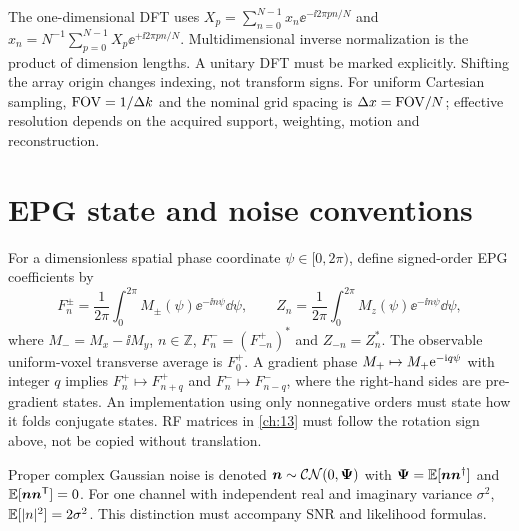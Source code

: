 The one-dimensional DFT uses
$X_p=\sum_{n=0}^{N-1}x_n\ee^{-\ii2\pi pn/N}$ and
$x_n=N^{-1}\sum_{p=0}^{N-1}X_p\ee^{+\ii2\pi pn/N}$.
Multidimensional inverse normalization is the product of dimension
lengths. A unitary DFT must be marked explicitly. Shifting the array
origin changes indexing, not transform signs. For uniform Cartesian
sampling, $\mathrm{FOV}=1/\Delta k$ and the nominal grid spacing is
$\Delta x=\mathrm{FOV}/N$; effective resolution depends on the acquired support,
weighting, motion and reconstruction.

\section*{EPG state and noise conventions}
For a dimensionless spatial phase coordinate $\psi\in[0,2\pi)$,
define signed-order EPG coefficients by
\begin{equation}
 F_n^\pm=\frac{1}{2\pi}\int_0^{2\pi}M_\pm(\psi)
             \ee^{-\ii n\psi}\dd\psi,\qquad
 Z_n=\frac{1}{2\pi}\int_0^{2\pi}M_z(\psi)
             \ee^{-\ii n\psi}\dd\psi ,
 \label{eq:convention:epg}
\end{equation}
where $M_-=M_x-\ii M_y$, $n\in\mathbb Z$,
$F_n^-=(F_{-n}^+)^*$ and $Z_{-n}=Z_n^*$.
The observable uniform-voxel transverse average is $F_0^+$.
A gradient phase $M_{+}\mapsto M_{+}\mathrm{e}^{-\mathrm{i} q\psi}$ with
integer $q$ implies
$F_n^+\mapsto F_{n+q}^+$ and $F_n^-\mapsto F_{n-q}^-$,
where the right-hand sides are pre-gradient states.
An implementation using only nonnegative orders must state how it
folds conjugate states. RF matrices in \cref{ch:13} must follow the
rotation sign above, not be copied without translation.

Proper complex Gaussian noise is denoted
$\bm{n}\sim\mathcal{CN}(0,\mathbf{\Psi})$ with
$\mathbf{\Psi}=\operatorname{\mathbb{E}}[\bm{n}\bm{n}^{\dagger}]$ and
$\operatorname{\mathbb{E}}[\bm{n}\bm{n}^{\mathsf T}]=0$.
For one channel with independent real and imaginary variance $\sigma^2$,
$\operatorname{\mathbb{E}}[\lvert n\rvert^2]=2\sigma^2$. This distinction must accompany SNR and
likelihood formulas.


